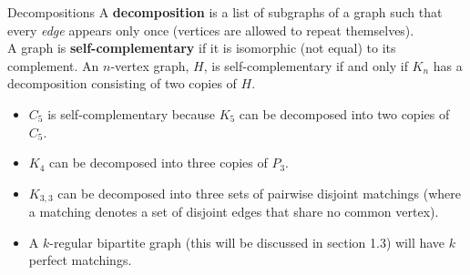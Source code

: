 \documentclass[10pt]{extarticle}
\begin{document}
\begin{problem}{Decompositions}
  A \textbf{decomposition} is a list of subgraphs of a graph such that every \textit{edge} appears only once (vertices are allowed to repeat themselves).\\

  A graph is \textbf{self-complementary} if it is isomorphic (not equal) to its complement. An $n$-vertex graph, $H$, is self-complementary if and only if $K_n$ has a decomposition consisting of two copies of $H$.

  \begin{itemize}
    \item $C_5$ is self-complementary because $K_5$ can be decomposed into two copies of $C_5$.
    \item $K_4$ can be decomposed into three copies of $P_3$.
    \item $K_{3,3}$ can be decomposed into three sets of pairwise disjoint matchings (where a matching denotes a set of disjoint edges that share no common vertex).
    \item A $k$-regular bipartite graph (this will be discussed in section 1.3) will have $k$ perfect matchings.
  \end{itemize}
\end{problem}
\end{document}
